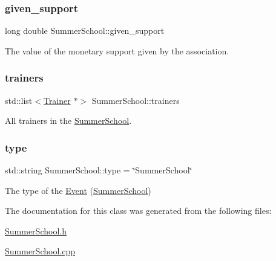 \subsubsection{\texorpdfstring{given\+\_\+support}{given\_support}}
{\footnotesize\ttfamily long double Summer\+School\+::given\+\_\+support\hspace{0.3cm}{\ttfamily [private]}}



The value of the monetary support given by the association. 

\mbox{\label{classSummerSchool_a3208a977c13ce8d7415b179a040efae3}} 
\subsubsection{\texorpdfstring{trainers}{trainers}}
{\footnotesize\ttfamily std\+::list$<$\mbox{\hyperlink{classTrainer}{Trainer}} $\ast$$>$ Summer\+School\+::trainers\hspace{0.3cm}{\ttfamily [private]}}



All trainers in the \mbox{\hyperlink{classSummerSchool}{Summer\+School}}. 

\mbox{\label{classSummerSchool_a4bce94c462b492844cacce921427d212}} 
\subsubsection{\texorpdfstring{type}{type}}
{\footnotesize\ttfamily std\+::string Summer\+School\+::type = \char`\"{}Summer\+School\char`\"{}\hspace{0.3cm}{\ttfamily [private]}}



The type of the \mbox{\hyperlink{classEvent}{Event}} (\mbox{\hyperlink{classSummerSchool}{Summer\+School}}) 



The documentation for this class was generated from the following files\+:\begin{DoxyCompactItemize}
\item 
\mbox{\hyperlink{SummerSchool_8h}{Summer\+School.\+h}}\item 
\mbox{\hyperlink{SummerSchool_8cpp}{Summer\+School.\+cpp}}\end{DoxyCompactItemize}
